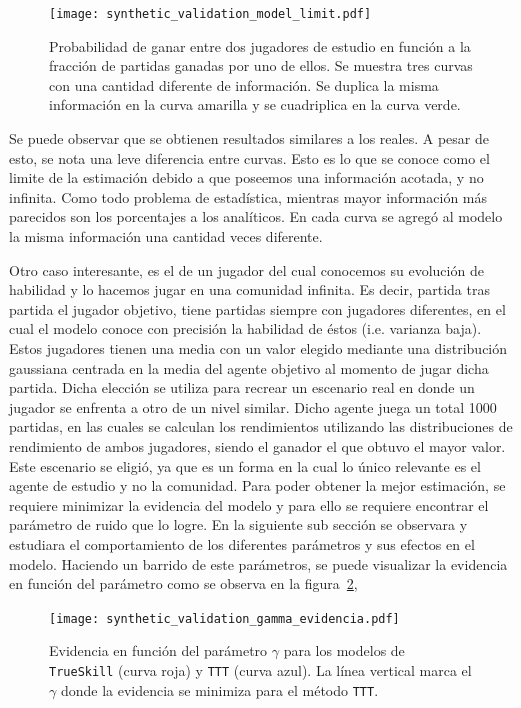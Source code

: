 \documentclass[11pt,twoside,spanish]{report} %
\begin{document}
 \begin{figure}[H]
	\centering
	\texttt{[image: synthetic\_validation\_model\_limit.pdf]}
	\caption{Probabilidad de ganar entre dos jugadores de estudio en funci\'on a la fracci\'on de partidas ganadas por uno de ellos. Se muestra tres curvas con una cantidad diferente de informaci\'on. Se duplica la misma informaci\'on en la curva amarilla y se cuadriplica en la curva verde.}
	\label{fig:limite}
\end{figure}

Se puede observar que se obtienen resultados similares a los reales.
A pesar de esto, se nota una leve diferencia entre curvas. Esto es lo que se conoce como el limite de la estimaci\'on debido a que poseemos una informaci\'on acotada, y no infinita.
Como todo problema de estad\'istica, mientras mayor informaci\'on m\'as parecidos son los porcentajes a los anal\'iticos.
En cada curva se agreg\'o al modelo la misma informaci\'on una cantidad veces diferente.

Otro caso interesante, es el  de un jugador del cual conocemos su evoluci\'on de habilidad y lo hacemos jugar en una comunidad infinita.
Es decir, partida tras partida el jugador objetivo, tiene partidas siempre con jugadores diferentes, en el cual el modelo conoce con precisi\'on la habilidad de \'estos (i.e. varianza baja).
Estos jugadores tienen una media con un valor elegido mediante una distribuci\'on gaussiana centrada en la media del agente objetivo al momento de jugar dicha partida.
Dicha elecci\'on se utiliza para recrear un escenario real en donde un jugador se enfrenta a otro de un nivel similar.
Dicho agente juega un total 1000 partidas, en las cuales se calculan los rendimientos utilizando las distribuciones de rendimiento de ambos jugadores, siendo el ganador el que obtuvo el mayor valor.
Este escenario se eligi\'o, ya que es un forma en la cual lo \'unico relevante es el agente de estudio y no la comunidad.
Para poder obtener la mejor estimaci\'on, se requiere minimizar la evidencia del modelo y para ello se requiere encontrar el par\'ametro de ruido que lo logre.
En la siguiente sub secci\'on se observara y estudiara el comportamiento de los diferentes par\'ametros y sus efectos en el modelo.
Haciendo un barrido de este par\'ametros, se puede visualizar la evidencia en funci\'on del par\'ametro como se observa en la figura~\ref{fig:gammaVSev},

\begin{figure}[H]
	\centering
	\texttt{[image: synthetic\_validation\_gamma\_evidencia.pdf]}
	\caption{Evidencia en funci\'on del par\'ametro $\gamma$ para los modelos de \texttt{TrueSkill} (curva roja) y \texttt{TTT} (curva azul). La l\'inea vertical marca el $\gamma$ donde la evidencia se minimiza para el m\'etodo \texttt{TTT}.}
	\label{fig:gammaVSev}
\end{figure}
\end{document}

